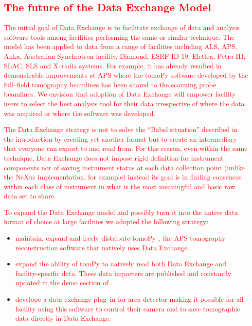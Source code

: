 \documentclass[pdf]{iucr}              %
\begin{document}
\textcolor{red}{\section{The future of the Data Exchange Model}}

\textcolor{red}{The initial goal of Data Exchange is to facilitate exchange of data and analysis software tools among facilities performing the same or similar technique. The model has been applied to data from a range of facilities including ALS, APS, Anka, Australian Synchrotron facility, Diamond, ESRF ID-19, Elettra, Petra III, SLAC, SLS and X--radia systems. For example, it has already resulted in demonstrable improvements at APS where the tomoPy software developed by the full--field tomography beamlines has been shared to the scanning probe beamlines. We envision that adoption of Data Exchange will empower facility users to select the best analysis tool for their data irrespective of where the data was acquired or where the software was developed.}

\textcolor{red}{The Data Exchange strategy is not to solve the ``Babel situation'' described in the introduction by creating yet another format but to create an intermediary that everyone can export to and read from. For this reason, even within the same technique, Data Exchange does not impose rigid definition for instrument components nor of saving instrument status at each data collection point (unlike the NeXus implementation, for example) instead its goal is in finding consensus within each class of instrument in what is the most meaningful and basic raw data set to share.}

\textcolor{red}{To expand the Data Exchange model and possibly turn it into the native data format of choice at large facilities we adopted the following strategy:}

\begin{itemize}
    \item \textcolor{red}{maintain, expand and freely distribute tomoPy \cite{python_cpp}, the APS \textcolor{red}{tomography reconstruction} software that natively uses Data Exchange.} 
\item \textcolor{red}{expand the ability of tomPy to natively read both Data Exchange and facility-specific data. These data importers are published and constantly updated in the demo section of \cite{data_exchange}.}
\item \textcolor{red}{develope a data exchange plug--in for area detector \cite{area_detector} making it possible for all facility using this software to control their camera and to save tomographic data directly in Data Exchange.}
\end{itemize}
\end{document}
